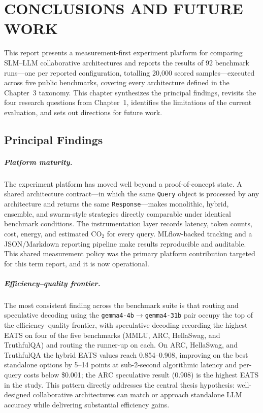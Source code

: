 \chapter{CONCLUSIONS AND FUTURE WORK}

This report presents a measurement-first experiment platform for comparing SLM--LLM collaborative architectures and reports the results of 92 benchmark runs---one per reported configuration, totalling 20{,}000 scored samples---executed across five public benchmarks, covering every architecture defined in the Chapter~3 taxonomy. This chapter synthesizes the principal findings, revisits the four research questions from Chapter~1, identifies the limitations of the current evaluation, and sets out directions for future work.

\section{Principal Findings}

\paragraph{Platform maturity.}
The experiment platform has moved well beyond a proof-of-concept state. A shared architecture contract---in which the same \texttt{Query} object is processed by any architecture and returns the same \texttt{Response}---makes monolithic, hybrid, ensemble, and swarm-style strategies directly comparable under identical benchmark conditions. The instrumentation layer records latency, token counts, cost, energy, and estimated CO$_2$ for every query. MLflow-backed tracking and a JSON/Markdown reporting pipeline make results reproducible and auditable. This shared measurement policy was the primary platform contribution targeted for this term report, and it is now operational.

\paragraph{Efficiency--quality frontier.}
The most consistent finding across the benchmark suite is that routing and speculative decoding using the \texttt{gemma4-4b}$\rightarrow$\texttt{gemma4-31b} pair occupy the top of the efficiency--quality frontier, with speculative decoding recording the highest EATS on four of the five benchmarks (MMLU, ARC, HellaSwag, and TruthfulQA) and routing the runner-up on each. On ARC, HellaSwag, and TruthfulQA the hybrid EATS values reach 0.854--0.908, improving on the best standalone options by 5--14 points at sub-2-second algorithmic latency and per-query costs below \$0.001; the ARC speculative result (0.908) is the highest EATS in the study. This pattern directly addresses the central thesis hypothesis: well-designed collaborative architectures can match or approach standalone LLM accuracy while delivering substantial efficiency gains.

